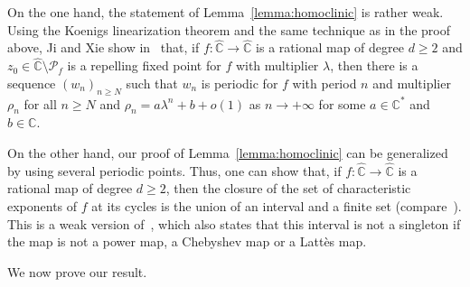 \begin{remark}
On the one hand, the statement of Lemma~\ref{lemma:homoclinic} is rather weak. Using the Koenigs linearization theorem and the same technique as in the proof above, Ji and Xie show in~\cite[\S2]{JX2022} that, if $f \colon \widehat{\mathbb{C}} \to \widehat{\mathbb{C}}$ is a rational map of degree $d \geq 2$ and $z_{0} \in \widehat{\mathbb{C}} \setminus \mathcal{P}_{f}$ is a repelling fixed point for $f$ with multiplier $\lambda$, then there is a sequence $(w_{n})_{n \geq N}$ such that $w_{n}$ is periodic for $f$ with period $n$ and multiplier $\rho_{n}$ for all $n \geq N$ and $\rho_{n} = a \lambda^{n} +b +o(1)$ as $n \to +\infty$ for some $a \in \mathbb{C}^{*}$ and $b \in \mathbb{C}$.

On the other hand, our proof of Lemma~\ref{lemma:homoclinic} can be generalized by using several periodic points. Thus, one can show that, if $f \colon \widehat{\mathbb{C}} \to \widehat{\mathbb{C}}$ is a rational map of degree $d \geq 2$, then the closure of the set of characteristic exponents of $f$ at its cycles is the union of an interval and a finite set (compare~\cite[Proof of Lem.\,2.1]{FG2022}). This is a weak version of~\cite[Cor.\,1.16]{JX2022}, which also states that this interval is not a singleton if the map is not a power map, a Chebyshev map or a Lattès map.
\end{remark}

We now prove our result.

